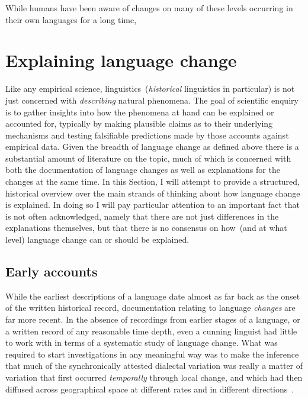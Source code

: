 While humans have been aware of changes on many of these levels occurring in their own languages for a long time, 

\section{Explaining language change}

Like any empirical science, linguistics~(\emph{historical} linguistics in particular) is not just concerned with \emph{describing} natural phenomena. The goal of scientific enquiry is to gather insights into how the phenomena at hand can be explained or accounted for, typically by making plausible claims as to their underlying mechanisms and testing falsifiable predictions made by those accounts against empirical data. Given the breadth of language change as defined above there is a substantial amount of literature on the topic, much of which is concerned with both the documentation of language changes as well as explanations for the changes at the same time.
In this Section, I will attempt to provide a structured, historical overview over the main strands of thinking about how language change is explained.
In doing so I will pay particular attention to an important fact that is not often acknowledged, namely that there are not just differences in the explanations themselves, but that there is no consensus on how~(and at what level) language change can or should be explained.


\subsection{Early accounts}

While the earliest descriptions of a language date almost as far back as the onset of the written historical record, documentation relating to language \emph{changes} are far more recent.
In the absence of recordings from earlier stages of a language, or a written record of any reasonable time depth, even a cunning linguist had little to work with in terms of a systematic study of language change. %
What was required to start investigations in any meaningful way was to make the inference that much of the synchronically attested dialectal variation was really a matter of variation that first occurred \emph{temporally} through local change, and which had then diffused across geographical space at different rates and in different directions~\citep{Chambers1998}.

